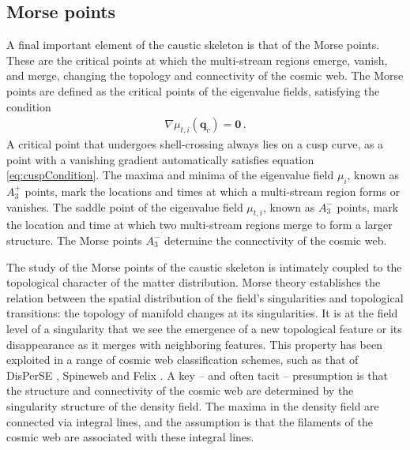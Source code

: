 \documentclass[a4paper, 11pt]{article}
\begin{document}
\subsection{Morse points}
A final important element of the caustic skeleton is that of the Morse points. These are the critical points at which the multi-stream regions emerge, vanish, and merge, changing the topology and connectivity of the cosmic web. The Morse points are defined as the critical points of the eigenvalue fields, satisfying the condition
\begin{align}
\nabla \mu_{t,i}(\bm{q}_c)=\bm{0}\,.
\end{align}
A critical point that undergoes shell-crossing always lies on a cusp curve, as a point with a vanishing gradient automatically satisfies equation \eqref{eq:cuspCondition}. The maxima and minima of the eigenvalue field $\mu_i$, known as $A_3^+$ points, mark the locations and times at which a multi-stream region forms or vanishes. The saddle point of the eigenvalue field $\mu_{t,i}$, known as $A_3^-$ points, mark the location and time at which two multi-stream regions merge to form a larger structure. The Morse points $A_3^-$ determine the connectivity of the cosmic web.

\bigskip
The study of the Morse points of the caustic skeleton is intimately coupled to the topological character of the matter distribution. Morse theory \citep{Milnor:1963} establishes the relation between the spatial distribution of the field's singularities and topological transitions: the topology of manifold changes at its singularities. It is at the field level of a singularity that we see the emergence of a new topological feature or its disappearance as it merges with neighboring features. This property has been exploited in a range of cosmic web classification schemes, such as that of DisPerSE \cite{Sousbie:2011a, Sousbie:2011b}, Spineweb \cite{Aragon:2010b} and Felix \citep{Shivashankar:2016}. A key -- and often tacit -- presumption is that the structure and connectivity of the cosmic web are determined by the singularity structure of the density field. The maxima in the density field are connected via integral lines, and the assumption is that the filaments of the cosmic web are associated with these integral lines.
\end{document}
